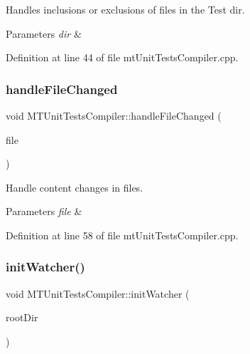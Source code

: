 Handles inclusions or exclusions of files in the Test dir. 


\begin{DoxyParams}{Parameters}
{\em dir} & \\
\hline
\end{DoxyParams}


Definition at line 44 of file mt\+Unit\+Tests\+Compiler.\+cpp.

\mbox{\label{class_m_t_unit_tests_compiler_ad8f142f5b3dc90fbca24ba35456681be}} 
\subsubsection{\texorpdfstring{handle\+File\+Changed}{handleFileChanged}}
{\footnotesize\ttfamily void M\+T\+Unit\+Tests\+Compiler\+::handle\+File\+Changed (\begin{DoxyParamCaption}\item[{Q\+String}]{file }\end{DoxyParamCaption})\hspace{0.3cm}{\ttfamily [slot]}}



Handle content changes in files. 


\begin{DoxyParams}{Parameters}
{\em file} & \\
\hline
\end{DoxyParams}


Definition at line 58 of file mt\+Unit\+Tests\+Compiler.\+cpp.

\mbox{\label{class_m_t_unit_tests_compiler_afab7db9083a0cd6869b69c989898e4ee}} 
\subsubsection{\texorpdfstring{init\+Watcher()}{initWatcher()}}
{\footnotesize\ttfamily void M\+T\+Unit\+Tests\+Compiler\+::init\+Watcher (\begin{DoxyParamCaption}\item[{Q\+String}]{root\+Dir }\end{DoxyParamCaption})}



